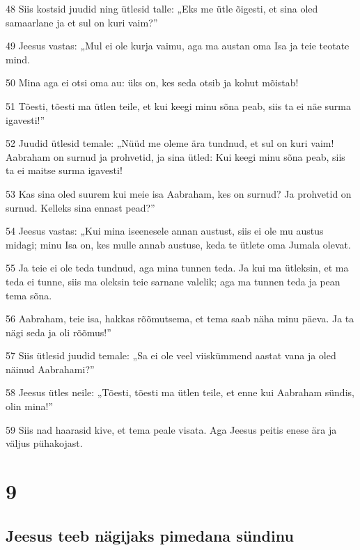 \par 48 Siis kostsid juudid ning ütlesid talle: „Eks me ütle õigesti, et sina oled samaarlane ja et sul on kuri vaim?”
\par 49 Jeesus vastas: „Mul ei ole kurja vaimu, aga ma austan oma Isa ja teie teotate mind.
\par 50 Mina aga ei otsi oma au: üks on, kes seda otsib ja kohut mõistab!
\par 51 Tõesti, tõesti ma ütlen teile, et kui keegi minu sõna peab, siis ta ei näe surma igavesti!”
\par 52 Juudid ütlesid temale: „Nüüd me oleme ära tundnud, et sul on kuri vaim! Aabraham on surnud ja prohvetid, ja sina ütled: Kui keegi minu sõna peab, siis ta ei maitse surma igavesti!
\par 53 Kas sina oled suurem kui meie isa Aabraham, kes on surnud? Ja prohvetid on surnud. Kelleks sina ennast pead?”
\par 54 Jeesus vastas: „Kui mina iseenesele annan austust, siis ei ole mu austus midagi; minu Isa on, kes mulle annab austuse, keda te ütlete oma Jumala olevat.
\par 55 Ja teie ei ole teda tundnud, aga mina tunnen teda. Ja kui ma ütleksin, et ma teda ei tunne, siis ma oleksin teie sarnane valelik; aga ma tunnen teda ja pean tema sõna.
\par 56 Aabraham, teie isa, hakkas rõõmutsema, et tema saab näha minu päeva. Ja ta nägi seda ja oli rõõmus!”
\par 57 Siis ütlesid juudid temale: „Sa ei ole veel viiskümmend aastat vana ja oled näinud Aabrahami?”
\par 58 Jeesus ütles neile: „Tõesti, tõesti ma ütlen teile, et enne kui Aabraham sündis, olin mina!”
\par 59 Siis nad haarasid kive, et tema peale visata. Aga Jeesus peitis enese ära ja väljus pühakojast.


\chapter{9}

\section*{Jeesus teeb nägijaks pimedana sündinu}


